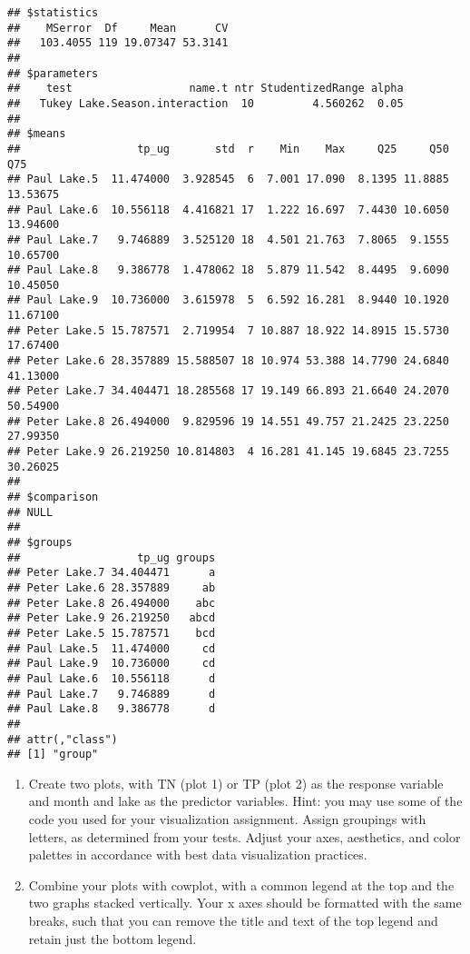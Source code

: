 \documentclass[]{article}
\begin{document}
\begin{verbatim}
## $statistics
##    MSerror  Df     Mean      CV
##   103.4055 119 19.07347 53.3141
## 
## $parameters
##    test                  name.t ntr StudentizedRange alpha
##   Tukey Lake.Season.interaction  10         4.560262  0.05
## 
## $means
##                  tp_ug       std  r    Min    Max     Q25     Q50      Q75
## Paul Lake.5  11.474000  3.928545  6  7.001 17.090  8.1395 11.8885 13.53675
## Paul Lake.6  10.556118  4.416821 17  1.222 16.697  7.4430 10.6050 13.94600
## Paul Lake.7   9.746889  3.525120 18  4.501 21.763  7.8065  9.1555 10.65700
## Paul Lake.8   9.386778  1.478062 18  5.879 11.542  8.4495  9.6090 10.45050
## Paul Lake.9  10.736000  3.615978  5  6.592 16.281  8.9440 10.1920 11.67100
## Peter Lake.5 15.787571  2.719954  7 10.887 18.922 14.8915 15.5730 17.67400
## Peter Lake.6 28.357889 15.588507 18 10.974 53.388 14.7790 24.6840 41.13000
## Peter Lake.7 34.404471 18.285568 17 19.149 66.893 21.6640 24.2070 50.54900
## Peter Lake.8 26.494000  9.829596 19 14.551 49.757 21.2425 23.2250 27.99350
## Peter Lake.9 26.219250 10.814803  4 16.281 41.145 19.6845 23.7255 30.26025
## 
## $comparison
## NULL
## 
## $groups
##                  tp_ug groups
## Peter Lake.7 34.404471      a
## Peter Lake.6 28.357889     ab
## Peter Lake.8 26.494000    abc
## Peter Lake.9 26.219250   abcd
## Peter Lake.5 15.787571    bcd
## Paul Lake.5  11.474000     cd
## Paul Lake.9  10.736000     cd
## Paul Lake.6  10.556118      d
## Paul Lake.7   9.746889      d
## Paul Lake.8   9.386778      d
## 
## attr(,"class")
## [1] "group"
\end{verbatim}

\begin{enumerate}
\def\labelenumi{\arabic{enumi}.}
\setcounter{enumi}{6}
\item
  Create two plots, with TN (plot 1) or TP (plot 2) as the response
  variable and month and lake as the predictor variables. Hint: you may
  use some of the code you used for your visualization assignment.
  Assign groupings with letters, as determined from your tests. Adjust
  your axes, aesthetics, and color palettes in accordance with best data
  visualization practices.
\item
  Combine your plots with cowplot, with a common legend at the top and
  the two graphs stacked vertically. Your x axes should be formatted
  with the same breaks, such that you can remove the title and text of
  the top legend and retain just the bottom legend.
\end{enumerate}
\end{document}
